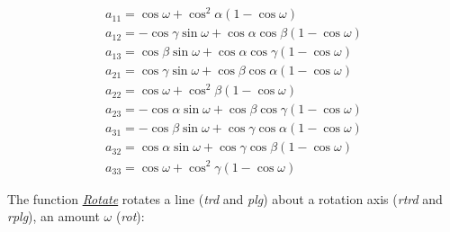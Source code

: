 \documentclass[a4paper , 12pt]{book}
\begin{document}
\begin{equation}
    \begin{split}
        a_{11}=\cos\omega+\cos^2\alpha(1-\cos\omega) \hspace{30pt} \\
        a_{12}=-\cos\gamma\sin\omega+\cos\alpha\cos\beta(1-\cos\omega) \\
        a_{13}=\cos\beta\sin\omega+\cos\alpha\cos\gamma(1-\cos\omega) \hspace{7pt} \\
        a_{21}=\cos\gamma\sin\omega+\cos\beta\cos\alpha(1-\cos\omega) \hspace{7pt} \\
        a_{22}=\cos\omega+\cos^2\beta(1-\cos\omega) \hspace{30pt} \\
        a_{23}=-\cos\alpha\sin\omega+\cos\beta\cos\gamma(1-\cos\omega) \\
        a_{31}=-\cos\beta\sin\omega+\cos\gamma\cos\alpha(1-\cos\omega) \\
        a_{32}=\cos\alpha\sin\omega+\cos\gamma\cos\beta(1-\cos\omega) \hspace{7pt} \\
        a_{33}=\cos\omega+\cos^2\gamma(1-\cos\omega) \hspace{30pt}
    \end{split}
\end{equation}

The function \href{https://github.com/nfcd/compGeo/blob/master/source/functions/Rotate.py}{\textit{Rotate}} rotates a line (\textit{trd} and \textit{plg}) about a rotation axis (\textit{rtrd} and \textit{rplg}), an amount $\omega$ (\textit{rot}):
\end{document}
